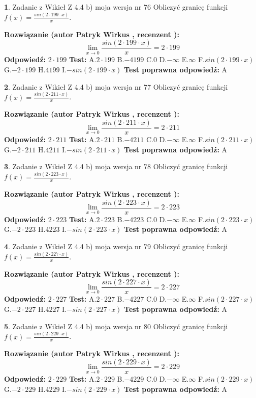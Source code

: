 \documentclass[12pt, a4paper]{article}
\theoremstyle{definition} %
\newtheorem{zad}{}
\newcommand{\zadStart}[1]{\begin{zad}#1\newline}
\newcommand{\zadStop}{\end{zad}}
\newcommand{\rozwStart}[2]{\noindent \textbf{Rozwiązanie (autor #1 , recenzent #2): }\newline}
\newcommand{\rozwStop}{\newline}
\newcommand{\odpStart}{\noindent \textbf{Odpowiedź:}\newline}
\newcommand{\odpStop}{\newline}
\newcommand{\testStart}{\noindent \textbf{Test:}\newline}
\newcommand{\testStop}{\newline}
\newcommand{\kluczStart}{\noindent \textbf{Test poprawna odpowiedź:}\newline}
\newcommand{\kluczStop}{\newline}
\begin{document}
\zadStart{Zadanie z Wikieł Z 4.4 b) moja wersja nr 76}
Obliczyć granicę funkcji $f(x)=\frac{sin(2 \cdot199\cdot x)}{x}$.
\zadStop
\rozwStart{Patryk Wirkus}{}
$$\lim\limits_{x\to 0}\frac{sin(2 \cdot 199\cdot x)}{x}=
2 \cdot 199$$
\rozwStop
\odpStart
$2 \cdot 199$
\odpStop
\testStart
A.$2 \cdot 199$
B.$-4199$
C.$0$
D.$-\infty$
E.$\infty$
F.$sin(2 \cdot 199\cdot x)$
G.$-2 \cdot 199$
H.$4199$
I.$-sin(2 \cdot 199\cdot x)$
\testStop
\kluczStart
A
\kluczStop



\zadStart{Zadanie z Wikieł Z 4.4 b) moja wersja nr 77}
Obliczyć granicę funkcji $f(x)=\frac{sin(2 \cdot211\cdot x)}{x}$.
\zadStop
\rozwStart{Patryk Wirkus}{}
$$\lim\limits_{x\to 0}\frac{sin(2 \cdot 211\cdot x)}{x}=
2 \cdot 211$$
\rozwStop
\odpStart
$2 \cdot 211$
\odpStop
\testStart
A.$2 \cdot 211$
B.$-4211$
C.$0$
D.$-\infty$
E.$\infty$
F.$sin(2 \cdot 211\cdot x)$
G.$-2 \cdot 211$
H.$4211$
I.$-sin(2 \cdot 211\cdot x)$
\testStop
\kluczStart
A
\kluczStop



\zadStart{Zadanie z Wikieł Z 4.4 b) moja wersja nr 78}
Obliczyć granicę funkcji $f(x)=\frac{sin(2 \cdot223\cdot x)}{x}$.
\zadStop
\rozwStart{Patryk Wirkus}{}
$$\lim\limits_{x\to 0}\frac{sin(2 \cdot 223\cdot x)}{x}=
2 \cdot 223$$
\rozwStop
\odpStart
$2 \cdot 223$
\odpStop
\testStart
A.$2 \cdot 223$
B.$-4223$
C.$0$
D.$-\infty$
E.$\infty$
F.$sin(2 \cdot 223\cdot x)$
G.$-2 \cdot 223$
H.$4223$
I.$-sin(2 \cdot 223\cdot x)$
\testStop
\kluczStart
A
\kluczStop



\zadStart{Zadanie z Wikieł Z 4.4 b) moja wersja nr 79}
Obliczyć granicę funkcji $f(x)=\frac{sin(2 \cdot227\cdot x)}{x}$.
\zadStop
\rozwStart{Patryk Wirkus}{}
$$\lim\limits_{x\to 0}\frac{sin(2 \cdot 227\cdot x)}{x}=
2 \cdot 227$$
\rozwStop
\odpStart
$2 \cdot 227$
\odpStop
\testStart
A.$2 \cdot 227$
B.$-4227$
C.$0$
D.$-\infty$
E.$\infty$
F.$sin(2 \cdot 227\cdot x)$
G.$-2 \cdot 227$
H.$4227$
I.$-sin(2 \cdot 227\cdot x)$
\testStop
\kluczStart
A
\kluczStop



\zadStart{Zadanie z Wikieł Z 4.4 b) moja wersja nr 80}
Obliczyć granicę funkcji $f(x)=\frac{sin(2 \cdot229\cdot x)}{x}$.
\zadStop
\rozwStart{Patryk Wirkus}{}
$$\lim\limits_{x\to 0}\frac{sin(2 \cdot 229\cdot x)}{x}=
2 \cdot 229$$
\rozwStop
\odpStart
$2 \cdot 229$
\odpStop
\testStart
A.$2 \cdot 229$
B.$-4229$
C.$0$
D.$-\infty$
E.$\infty$
F.$sin(2 \cdot 229\cdot x)$
G.$-2 \cdot 229$
H.$4229$
I.$-sin(2 \cdot 229\cdot x)$
\testStop
\kluczStart
A
\kluczStop
\end{document}
